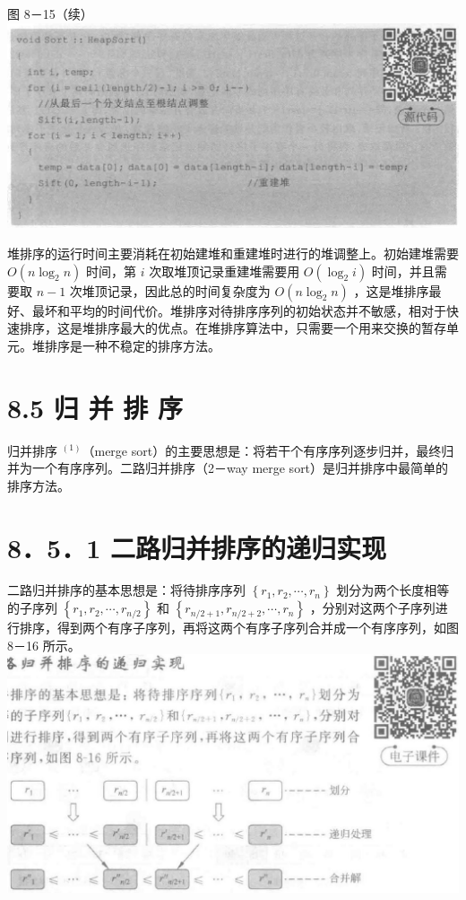 \documentclass[10pt]{article}
\begin{document}
图 8－15（续）\\
\includegraphics[max width=\textwidth, center]{2025_06_06_704745ea57b15b2333e5g-286(4)}

堆排序的运行时间主要消耗在初始建堆和重建堆时进行的堆调整上。初始建堆需要 $O\left(n \log _{2} n\right)$ 时间，第 $i$ 次取堆顶记录重建堆需要用 $O\left(\log _{2} i\right)$ 时间，并且需要取 $n-1$ 次堆顶记录，因此总的时间复杂度为 $O\left(n \log _{2} n\right)$ ，这是堆排序最好、最坏和平均的时间代价。堆排序对待排序序列的初始状态并不敏感，相对于快速排序，这是堆排序最大的优点。在堆排序算法中，只需要一个用来交换的暂存单元。堆排序是一种不稳定的排序方法。

\section*{8.5 归 并 排 序}
归并排序 ${ }^{(1)}$（merge sort）的主要思想是：将若干个有序序列逐步归并，最终归并为一个有序序列。二路归并排序（2－way merge sort）是归并排序中最简单的排序方法。

\section*{8．5．1 二路归并排序的递归实现}
二路归并排序的基本思想是：将待排序序列 $\left\{r_{1}, r_{2}, \cdots, r_{n}\right\}$ 划分为两个长度相等的子序列 $\left\{r_{1}, r_{2}, \cdots, r_{n / 2}\right\}$ 和 $\left\{r_{n / 2+1}, r_{n / 2+2}, \cdots, r_{n}\right\}$ ，分别对这两个子序列进行排序，得到两个有序子序列，再将这两个有序子序列合并成一个有序序列，如图 8－16 所示。\\
\includegraphics[max width=\textwidth, center]{2025_06_06_704745ea57b15b2333e5g-287(1)}
\end{document}
